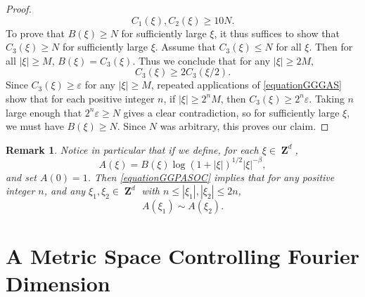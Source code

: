 \documentclass[12pt,reqno]{article}
\numberwithin{equation}{section}
\DeclareMathOperator{\ZZ}{\mathbf{Z}}
\newtheorem*{remark}{Remark}
\begin{document}
\begin{proof}
    \[ C_1(\xi), C_2(\xi) \geq 10N. \]
    To prove that $B(\xi) \geq N$ for sufficiently large $\xi$, it thus suffices to show that $C_3(\xi) \geq N$ for sufficiently large $\xi$. Assume that $C_3(\xi) \leq N$ for all $\xi$. Then for all $|\xi| \geq M$, $B(\xi) = C_3(\xi)$. Thus we conclude that for any $|\xi| \geq 2M$,
    \begin{equation} \label{equationGGGAS}
        C_3(\xi) \geq 2 C_3(\xi/2).
    \end{equation}
    Since $C_3(\xi) \geq \varepsilon$ for any $|\xi| \geq M$, repeated applications of \eqref{equationGGGAS} show that for each positive integer $n$, if $|\xi| \geq 2^n M$, then $C_3(\xi) \geq 2^n \varepsilon$. Taking $n$ large enough that $2^n \varepsilon \geq N$ gives a clear contradiction, so for sufficiently large $\xi$, we must have $B(\xi) \geq N$. Since $N$ was arbitrary, this proves our claim.
\end{proof}

\begin{remark}
    Notice in particular that if we define, for each $\xi \in \ZZ^d$,
    \[ A(\xi) = B(\xi) \log(1 + |\xi|)^{1/2} |\xi|^{-\beta}, \]
    and set $A(0) = 1$. Then \eqref{equationGGPASOC} implies that for any positive integer $n$, and any $\xi_1, \xi_2 \in \ZZ^d$ with $n \leq |\xi_1|, |\xi_2| \leq 2n$,
    \begin{equation} \label{equationASADSDSCGGGGG}
        A(\xi_1) \sim A(\xi_2).
    \end{equation}
\end{remark}

\section{A Metric Space Controlling Fourier Dimension}
\end{document}
